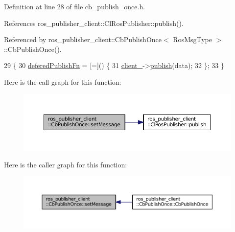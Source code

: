 Definition at line 28 of file cb\+\_\+publish\+\_\+once.\+h.



References ros\+\_\+publisher\+\_\+client\+::\+Cl\+Ros\+Publisher\+::publish().



Referenced by ros\+\_\+publisher\+\_\+client\+::\+Cb\+Publish\+Once$<$ Ros\+Msg\+Type $>$\+::\+Cb\+Publish\+Once().


\begin{DoxyCode}
29     \{
30         \hyperlink{classros__publisher__client_1_1CbPublishOnce_a91e0e3d574d25e160bcb3a4ca81bb0b2}{deferedPublishFn} = [=]() \{
31             \hyperlink{classros__publisher__client_1_1CbPublishOnce_a50a1b2a4892ad780406231e0f870746a}{client\_}->\hyperlink{classros__publisher__client_1_1ClRosPublisher_a9e62a3581a730cd2e287e560d04d151b}{publish}(data);
32         \};
33     \}
\end{DoxyCode}


Here is the call graph for this function\+:
\nopagebreak
\begin{figure}[H]
\begin{center}
\leavevmode
\includegraphics[width=350pt]{classros__publisher__client_1_1CbPublishOnce_a06bef500e116390ee85a790401e600d8_cgraph}
\end{center}
\end{figure}




Here is the caller graph for this function\+:
\nopagebreak
\begin{figure}[H]
\begin{center}
\leavevmode
\includegraphics[width=350pt]{classros__publisher__client_1_1CbPublishOnce_a06bef500e116390ee85a790401e600d8_icgraph}
\end{center}
\end{figure}




